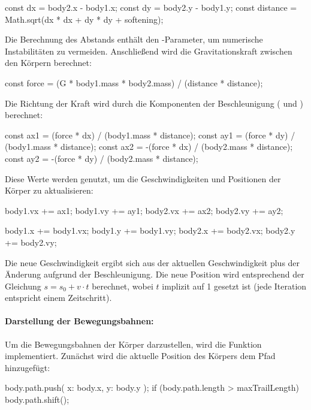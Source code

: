 \documentclass[a4paper,12pt,twoside]{article}
\begin{document}
\begin{javascript}
const dx = body2.x - body1.x;
const dy = body2.y - body1.y;
const distance = Math.sqrt(dx * dx + dy * dy + softening);
\end{javascript}

Die Berechnung des Abstands  enthält den -Parameter, um numerische Instabilitäten zu vermeiden. Anschließend wird die Gravitationskraft zwischen den Körpern berechnet:

\begin{javascript}
const force = (G * body1.mass * body2.mass) / (distance * distance);
\end{javascript}

Die Richtung der Kraft wird durch die Komponenten der Beschleunigung ( und ) berechnet:

\begin{javascript}
const ax1 = (force * dx) / (body1.mass * distance);
const ay1 = (force * dy) / (body1.mass * distance);
const ax2 = -(force * dx) / (body2.mass * distance);
const ay2 = -(force * dy) / (body2.mass * distance);
\end{javascript}

Diese Werte werden genutzt, um die Geschwindigkeiten und Positionen der Körper zu aktualisieren:

\begin{javascript}
body1.vx += ax1;
body1.vy += ay1;
body2.vx += ax2;
body2.vy += ay2;

body1.x += body1.vx;
body1.y += body1.vy;
body2.x += body2.vx;
body2.y += body2.vy;
\end{javascript}

Die neue Geschwindigkeit ergibt sich aus der aktuellen Geschwindigkeit plus der Änderung aufgrund der Beschleunigung. Die neue Position wird entsprechend der Gleichung \( s = s_0 + v \cdot t \) berechnet, wobei \( t \) implizit auf 1 gesetzt ist (jede Iteration entspricht einem Zeitschritt).

\paragraph{Darstellung der Bewegungsbahnen:}
Um die Bewegungsbahnen der Körper darzustellen, wird die Funktion  implementiert. Zunächst wird die aktuelle Position des Körpers dem Pfad hinzugefügt:

\begin{javascript}
body.path.push({ x: body.x, y: body.y });
if (body.path.length > maxTrailLength) body.path.shift();
\end{javascript}
\end{document}
